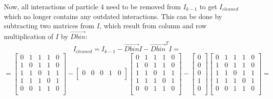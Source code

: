 \documentclass{article}
\begin{document}
Now, all interactions of particle 4 need to be removed from $I_{k-1}$ to get $I_{cleaned}$ which no longer contains any outdated interactions. This can be done by subtracting two matrices from $I$, which result from column and row multiplication of $I$ by $\Vec{Dbin}$:
$$
I_{cleaned}=I_{k-1}-\Vec{Dbin}I-\Vec{Dbin}^TI=
$$
$$
=
\begin{bmatrix}
    0 & 1 & 1 & 1 & 0\\
    1 & 0 & 1 & 1 & 0\\
    1 & 1 & 0 & 1 & 1\\
    1 & 1 & 1 & 0 & 1\\
    0 & 0 & 1 & 1 & 0\\
\end{bmatrix}
-
\begin{bmatrix}
    0 & 0 & 0 & 1 & 0\\
\end{bmatrix}
\begin{bmatrix}
    0 & 1 & 1 & 1 & 0\\
    1 & 0 & 1 & 1 & 0\\
    1 & 1 & 0 & 1 & 1\\
    1 & 1 & 1 & 0 & 1\\
    0 & 0 & 1 & 1 & 0\\
\end{bmatrix}
-
\begin{bmatrix}
    0\\
    0\\
    0\\
    1\\
    0\\
\end{bmatrix}
\begin{bmatrix}
    0 & 1 & 1 & 1 & 0\\
    1 & 0 & 1 & 1 & 0\\
    1 & 1 & 0 & 1 & 1\\
    1 & 1 & 1 & 0 & 1\\
    0 & 0 & 1 & 1 & 0\\
\end{bmatrix}
=
$$
\end{document}
